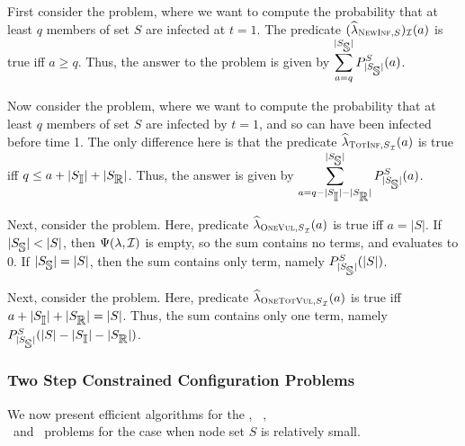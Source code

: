 
First consider the \OneNewInfs{} problem, where we want to compute 
the probability that at least $q$ members of set $S$ are infected at $t = 1$.
The predicate $(\widehat{\lambda}_{{\textsc{NewInf},S}})_{{\mathcal{I}}}(a)$ 
is true iff $a \geq q$.
Thus, the answer to the \OneNewInfs{} problem is given by
$\displaystyle{\sum_{a=q}
                    ^{|S_{\mbox{$\mathbb{S}$}}|}
                    P_{|S_{\mbox{$\mathbb{S}$}}|}^S(a)}$.



Now consider the \OneTotInfs{} problem,
where we want to compute 
the probability that at least $q$ members of set $S$ are infected by $t = 1$,
and so can have been infected before time 1.
The only difference here is that the
predicate $\widehat{\lambda}_{{\textsc{TotInf},S}_{\mathcal{I}}}(a)$ is 
true iff $q \leq a +  |S_{\mbox{$\mathbb{I}$}}| + |S_{\mbox{$\mathbb{R}$}}|$.
Thus, the answer is given by 
$\displaystyle{\sum_{a=q - |S_{\mbox{$\mathbb{I}$}}| - |S_{\mbox{$\mathbb{R}$}}|}
                    ^{|S_{\mbox{$\mathbb{S}$}}|}
                    P_{|S_{\mbox{$\mathbb{S}$}}|}^S(a)}$.


Next, consider the \OneVuls{} problem.
Here, predicate $\widehat{\lambda}_{{\textsc{OneVul},S}_{\mathcal{I}}}(a)$ is 
true iff $a = |S|$.
If $|S_{\mbox{$\mathbb{S}$}}| < |S|$, then $\Psi(\lambda, \mbox{${\cal I}$})$ is empty,
so the sum contains no terms, and evaluates to 0.
If $|S_{\mbox{$\mathbb{S}$}}| = |S|$, then the sum contains only term, 
namely 
$P_{|S_{\mbox{$\mathbb{S}$}}|}^S(|S|)$.

Next, consider the 
\OneTotVuls{} problem.
Here, predicate $\widehat{\lambda}_{{\textsc{OneTotVul},S}_{\mathcal{I}}}(a)$ is 
true iff $a +  |S_{\mbox{$\mathbb{I}$}}| + |S_{\mbox{$\mathbb{R}$}}| = |S|$.
Thus, the sum contains only one term, namely
$P_{|S_{\mbox{$\mathbb{S}$}}|}^S(|S| - |S_{\mbox{$\mathbb{I}$}}| - |S_{\mbox{$\mathbb{R}$}}|)$.
\QED




\subsubsection{Two Step Constrained Configuration Problems}
\label{sss:two_step_poly}
  
\newcommand{\calspp}{\mbox{${\cal S}''$}} 


We now present efficient
algorithms for the \TwoNewInfs{},~ \TwoTotInfs{},\\
\TwoVuls{} ~and~ \TwoTotVuls{} 
problems for the case when node set $S$ is relatively small.

